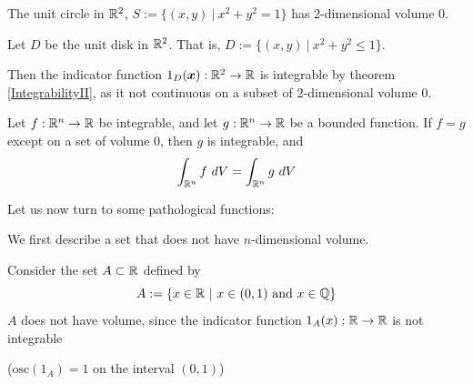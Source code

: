\begin{example}
    The unit circle in $\mathbb{R}^2$, $S := \{(x,y) \ | \ x^2 + y^2 = 1\}$ has 2-dimensional volume 0.
\end{example}

\begin{example}
        Let $D$ be the unit disk in $\mathbb{R}^2$.  That is, $D := \{(x,y) \ | \ x^2 + y^2 \leq 1\}$.

        Then the indicator function $1_D(\bm{x}) : \mathbb{R}^2 \to \mathbb{R}$ is integrable by theorem \ref{IntegrabilityII}, as it not continuous on a subset of 2-dimensional volume 0.
    \end{example}

\begin{corollary}
        Let $f: \mathbb{R}^n \to \mathbb{R}$ be integrable, and let $g : \mathbb{R}^n \to \mathbb{R}$ be a bounded function.  If $f=g$ except on a set of volume 0, then $g$ is integrable, and
        $$\int_{\mathbb{R}^n} f \ dV = \int_{\mathbb{R}^n} g \ dV$$
\end{corollary}


Let us now turn to some pathological functions:

We first describe a set that does not have $n$-dimensional volume.

\begin{example}\label{nonintegable}
    Consider the set $A \subset \mathbb{R}$ defined by 
    $$A := \{ x \in \mathbb{R} \ | \ x \in (0,1) \text{ and }  x \in \mathbb{Q} \}$$
    $A$ does not have volume, since the indicator function $1_A(x) : \mathbb{R} \to \mathbb{R}$ is not integrable 
    
    ($\text{osc}(1_A) = 1$ on the interval $(0,1)$)
 
\end{example}


